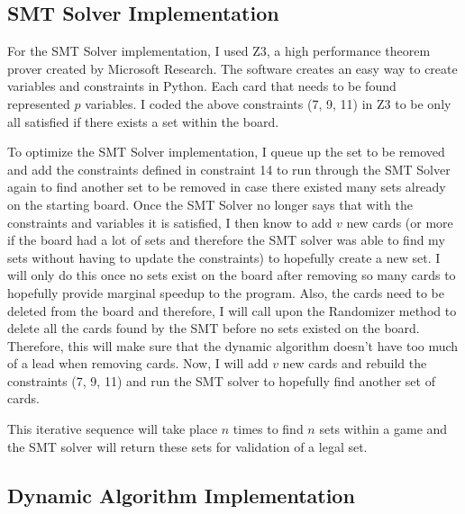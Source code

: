 \documentclass[pageno]{jpaper}
\begin{document}
\subsection{SMT Solver Implementation}


For the SMT Solver implementation, I used Z3, a high performance theorem prover created by Microsoft Research. The software creates an easy way to create variables and constraints in Python. Each card that needs to be found represented $p$ variables. I coded the above constraints (7, 9, 11) in Z3 to be only all satisfied if there exists a set within the board. 


To optimize the SMT Solver implementation, I queue up the set to be removed and add the constraints defined in constraint 14 to run through the SMT Solver again to find another set to be removed in case there existed many sets already on the starting board. Once the SMT Solver no longer says that with the constraints and variables it is satisfied, I then know to add $v$ new cards (or more if the board had a lot of sets and therefore the SMT solver was able to find my sets without having to update the constraints) to hopefully create a new set. I will only do this once no sets exist on the board after removing so many cards to hopefully provide marginal speedup to the program. Also, the cards need to be deleted from the board and therefore, I will call upon the Randomizer method to delete all the cards found by the SMT before no sets existed on the board. Therefore, this will make sure that the dynamic algorithm doesn't have too much of a lead when removing cards. Now, I will add $v$ new cards and rebuild the constraints (7, 9, 11) and run the SMT solver to hopefully find another set of cards. 

This iterative sequence will take place $n$ times to find $n$ sets within a game and the SMT solver will return these sets for validation of a legal set. 

\subsection{Dynamic Algorithm Implementation}
\end{document}
